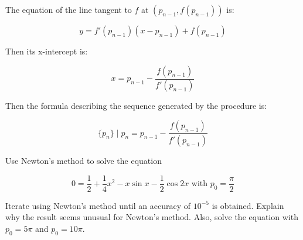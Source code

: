 \documentclass[../../../../Assignments]{subfiles}
\begin{document}
\begin{solution}
    The equation of the line tangent to \(f\) at \((p_{n - 1}, f(p_{n - 1}))\)
    is:

    \[y = f'(p_{n - 1}) (x - p_{n - 1}) + f(p_{n - 1})\]

    Then its x-intercept is:

    \[x = p_{n - 1} - \frac{f(p_{n - 1})}{f'(p_{n - 1})}\]

    Then the formula describing the sequence generated by the procedure is:

    \[\{p_n\} \mid p_n = p_{n - 1} - \frac{f(p_{n - 1})}{f'(p_{n - 1})}\]
\end{solution}

\begin{exercise}
    Use Newton's method to solve the equation

    \[0 = \frac{1}{2} + \frac{1}{4} x^2 - x \sin{x} - \frac{1}{2} \cos{2x} \text{ with } p_0 = \frac{\pi}{2}\]

    Iterate using Newton's method until an accuracy of \(10^{-5}\) is obtained.
    Explain why the result seems unusual for Newton's method. Also, solve the
    equation with \(p_0 = 5 \pi\) and \(p_0 = 10 \pi\).
\end{exercise}
\end{document}
